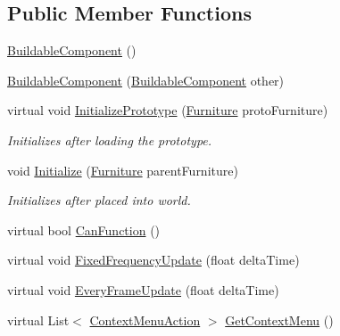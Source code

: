 \subsection*{Public Member Functions}
\begin{DoxyCompactItemize}
\item 
\hyperlink{class_project_porcupine_1_1_buildable_1_1_components_1_1_buildable_component_a256a38b8f8f3b33df233903ddae29867}{Buildable\+Component} ()
\item 
\hyperlink{class_project_porcupine_1_1_buildable_1_1_components_1_1_buildable_component_af69d5bff8618022633c71d8f0e949a54}{Buildable\+Component} (\hyperlink{class_project_porcupine_1_1_buildable_1_1_components_1_1_buildable_component}{Buildable\+Component} other)
\item 
virtual void \hyperlink{class_project_porcupine_1_1_buildable_1_1_components_1_1_buildable_component_a94210cf5d6a4ea1a90d6b54cd379836e}{Initialize\+Prototype} (\hyperlink{class_furniture}{Furniture} proto\+Furniture)
\begin{DoxyCompactList}\small\item\em Initializes after loading the prototype. \end{DoxyCompactList}\item 
void \hyperlink{class_project_porcupine_1_1_buildable_1_1_components_1_1_buildable_component_ac2ca9344f184cd922fa8a089a95f6765}{Initialize} (\hyperlink{class_furniture}{Furniture} parent\+Furniture)
\begin{DoxyCompactList}\small\item\em Initializes after placed into world. \end{DoxyCompactList}\item 
virtual bool \hyperlink{class_project_porcupine_1_1_buildable_1_1_components_1_1_buildable_component_a589203e44ce8de22262caead43ad38d6}{Can\+Function} ()
\item 
virtual void \hyperlink{class_project_porcupine_1_1_buildable_1_1_components_1_1_buildable_component_a0528e50f3dbe24481256802e758deeb9}{Fixed\+Frequency\+Update} (float delta\+Time)
\item 
virtual void \hyperlink{class_project_porcupine_1_1_buildable_1_1_components_1_1_buildable_component_a3e28428fccf4350118bef518e98af024}{Every\+Frame\+Update} (float delta\+Time)
\item 
virtual List$<$ \hyperlink{class_context_menu_action}{Context\+Menu\+Action} $>$ \hyperlink{class_project_porcupine_1_1_buildable_1_1_components_1_1_buildable_component_aeab2f8844d0c51fbaceffc733b3eb74f}{Get\+Context\+Menu} ()

\end{DoxyCompactItemize}
